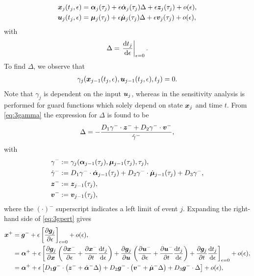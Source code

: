 \documentclass[../DC2017114Bouma.tex]{subfiles}
\begin{document}
\begin{align}
{\boldsymbol{x}}_j(t_{j},\epsilon) &= \boldsymbol{\alpha}_j(\tau_j) + \epsilon\dot{\boldsymbol{\alpha}}_j(\tau_j)\Delta + \epsilon{\boldsymbol{z}}_j(\tau_j) + o(\epsilon),\label{eq:3xexpand2}\\
{\boldsymbol{u}}_j(t_{j},\epsilon) &= \boldsymbol{\mu}_j(\tau_j) + \epsilon\dot{\boldsymbol{\mu}}_j(\tau_j)\Delta + \epsilon{\boldsymbol{v}}_j(\tau_j) + o(\epsilon),\label{eq:3uexpand2}
\end{align}
with
\begin{align}
\Delta = \left.\frac{\textnormal{d} t_{j}}{\textnormal{d}\epsilon}\right|_{\epsilon=0}.\label{eq:3Delta}
\end{align}
To find $\Delta$, we observe that
\begin{align}
\gamma_j({\boldsymbol{x}}_{j-1}(t_{j},\epsilon),{\boldsymbol{u}}_{j-1}(t_{j},\epsilon),t_{j}) = 0.\label{eq:3gamma}
\end{align}
Note that $\gamma_j$ is dependent on the input ${\boldsymbol{u}}_j$, whereas in \cite{Chen2018a} the sensitivity analysis is performed for guard functions which solely depend on state ${\boldsymbol{x}}_j$ and time $t$. From \eqref{eq:3gamma} the expression for $\Delta$ is found to be
\begin{align}
\Delta = -\frac{D_1\gamma^{-}\cdot{\boldsymbol{z}}^- + D_2\gamma^{-}\cdot{\boldsymbol{v}}^-}{\dot{\gamma}^{-}},\label{eq:3Deltaj}
\end{align}
with
\begin{align*}
\gamma^- &:= \gamma_j(\boldsymbol{\alpha}_{j-1}(\tau_j),\boldsymbol{\mu}_{j-1}(\tau_j),\tau_j),\\
\dot{\gamma}^- &:= D_1\gamma^-\cdot\dot{\boldsymbol{\alpha}}_{j-1}(\tau_j) + D_2\gamma^-\cdot\dot{\boldsymbol{\mu}}_{j-1}(\tau_j) + D_3\gamma^-,\\
{\boldsymbol{z}}^- &:= {\boldsymbol{z}}_{j-1}(\tau_j),\\
{\boldsymbol{v}}^- &:= {\boldsymbol{v}}_{j-1}(\tau_j),
\end{align*}
where the $(\cdot)^-$ superscript indicates a left limit of event $j$. Expanding the right-hand side of \eqref{eq:3gpert} gives
\begin{align}
{\boldsymbol{x}}^+ &= {\boldsymbol{g}}^- + \epsilon\left[\frac{\partial{\boldsymbol{g}}_j}{\partial\epsilon}\right]_{\epsilon=0} + o(\epsilon),\\
&= \boldsymbol{\alpha}^+ + \epsilon\left[\frac{\partial{\boldsymbol{g}}_j}{\partial{\boldsymbol{x}}}\left(\frac{\partial{\boldsymbol{x}}^-}{\partial\epsilon} + \frac{\partial{\boldsymbol{x}}^-}{\partial t}\frac{\text{d}t_j}{\text{d}\epsilon} \right) + \frac{\partial{\boldsymbol{g}}_j}{\partial{\boldsymbol{u}}}\left(\frac{\partial{\boldsymbol{u}}^-}{\partial\epsilon} + \frac{\partial{\boldsymbol{u}}^-}{\partial t}\frac{\text{d} t_j}{\text{d}\epsilon}\right) + \frac{\partial{\boldsymbol{g}}_j}{\partial t}\frac{\text{d} t_j}{\text{d}\epsilon} \right]_{\epsilon = 0} + o(\epsilon),\\
&= \boldsymbol{\alpha}^+ + \epsilon\left[D_1{\boldsymbol{g}}^-\cdot \left({\boldsymbol{z}}^- + \dot{\boldsymbol{\alpha}}^-\Delta\right) + D_2{\boldsymbol{g}}^-\cdot \left({\boldsymbol{v}}^- + \dot{\boldsymbol{\mu}}^- \Delta\right) + D_3{\boldsymbol{g}}^-\cdot \Delta\right] + o(\epsilon),\label{eq:3gexp}
\end{align}
\end{document}
